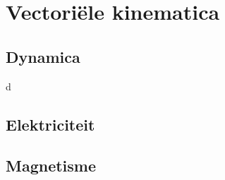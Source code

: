 \documentclass{exam}
\begin{document}
\vspace*{\fill}

\newpage

\section{Vectoriële kinematica}

\vspace{0.5cm}



\newpage

\vspace*{\fill}
\begin{center}
    
\section*{Dynamica}
\end{center}

\vspace*{\fill}

\newpage
 d


\newpage



% 


\vspace*{\fill}
\begin{center}
    
\section*{Elektriciteit}
\end{center}

\vspace*{\fill}

\newpage



\newpage

\vspace*{\fill}
\begin{center}
    
\section*{Magnetisme}
\end{center}

\vspace*{\fill}

\newpage


\end{document}
